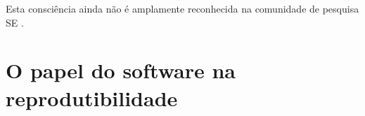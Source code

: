 Esta consciência ainda não é amplamente reconhecida na comunidade de pesquisa
SE \cite{stol2015holistic}.

\section{O papel do software na reprodutibilidade}


%
